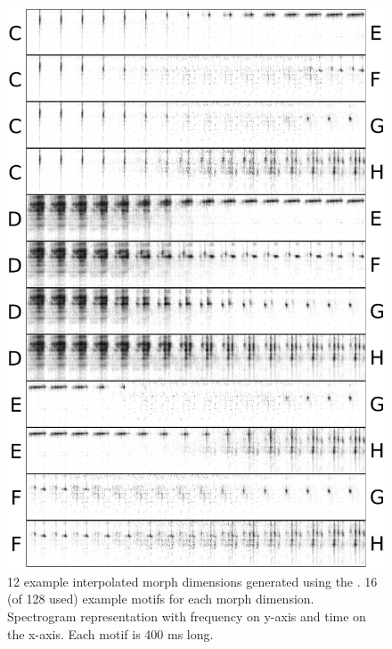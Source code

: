 \begin{figure}[tbp] 
  \centering
  \includegraphics[height=.8\textheight]{figures/supplemental/sfig01b-all-morphs-2.pdf}
  \caption[Generated morph dimensions 2/2]
{12 example interpolated morph dimensions generated using the \DBN. 16 (of 128 used) example motifs for each morph dimension. Spectrogram representation with frequency on y-axis and time on the x-axis. Each motif is 400 ms long.
}
  \label{fig:morphs2}
\end{figure}